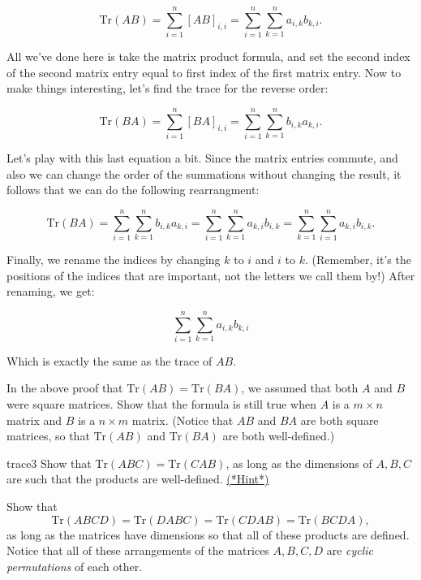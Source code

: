 \[ \text{Tr} \left({A} {B}\right) = \sum_{i=1}^n [AB]_{i,i} = \sum_{i=1}^n \sum_{k=1}^n a_{i,k}b_{k,i}. \]

All we've done here is take the matrix product formula, and set the second index of the second  matrix entry equal to first index of the first matrix entry.  Now to make things interesting, let's find the trace for the reverse order:

\[ \text{Tr} \left({B} {A}\right) = \sum_{i=1}^n [BA]_{i,i} = \sum_{i=1}^n \sum_{k=1}^n b_{i,k}a_{k,i}. \]

Let's play with this last equation a bit. Since the matrix entries commute, and also  we can change the order of the summations without changing the result, it follows that we can do the following rearrangment:

\[ \text{Tr} \left({B} {A}\right) =\sum_{i=1}^n \sum_{k=1}^n b_{i,k}a_{k,i} = \sum_{i=1}^n \sum_{k=1}^n a_{k,i}b_{i,k} = \sum_{k=1}^n \sum_{i=1}^n a_{k,i}b_{i,k}. \]

Finally, we rename the indices by changing $k$ to $i$ and $i$ to $k$.  (Remember, it's the positions of the indices that are important, not the letters we call them by!)  After renaming, we get:

\[ \sum_{i=1}^n \sum_{k=1}^n a_{i,k}b_{k,i} \]

Which is exactly the same as the trace of ${A}{B}$.

\begin {exercise}{}
In the above proof that $\text{Tr} ({AB}) = \text{Tr}({BA})$, we assumed that both $A$ and $B$ were square matrices. Show that the formula is still true when $A$ is a $m \times n$ matrix and $B$ is a $n \times m$ matrix.  (Notice that $AB$ and $BA$ are both square matrices, so that $\text{Tr} \left({A} {B}\right)$ and $\text{Tr} \left({B} {A}\right)$ are both well-defined.)
\end{exercise}

\begin {exercise}{trace3}
Show that $\text{Tr} ({ABC}) = \text{Tr}({CAB})$, as long as the dimensions of $A, B, C$ are such that the products are well-defined.
\hyperref[sec:sigma:hints]{(*Hint*)} 
\end{exercise}


\begin {exercise}{}
Show that 
\[ \text{Tr} ({ABCD}) = \text{Tr}({DABC})= \text{Tr}({CDAB}) = \text{Tr}({BCDA}),\] 
as long as the matrices have dimensions so that all of these products are defined.  Notice that all of these arrangements of the matrices $A, B, C, D$ are \emph{cyclic permutations} of each other.
\end{exercise}

